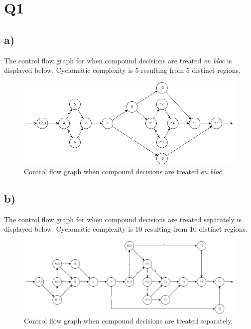 \documentclass[12pt, letterpaper, titlepage]{article}
\begin{document}
 
\onehalfspacing

\section*{Q1}
\subsection*{a)}
The control flow graph for when compound decisions are treated \textit{en bloc} is displayed below. Cyclomatic complexity is 5 resulting from 5 distinct regions.
\begin{figure}[H]
    \centering
    \caption{Control flow graph when compound decisions are treated \textit{en bloc}.}
    \includegraphics[width=\textwidth]{Q1a.png}
\end{figure}

\subsection*{b)}
The control flow graph for when compound decisions are treated separately is displayed below. Cyclomatic complexity is 10 resulting from 10 distinct regions.
\begin{figure}[H]
    \centering
    \caption{Control flow graph when compound decisions are treated separately.}
    \includegraphics[width=\textwidth]{Q1b.png}
\end{figure}
\end{document}
